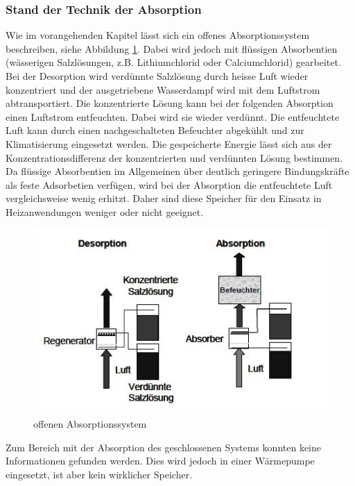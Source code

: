\documentclass[11pt,a4paper]{scrartcl}
\begin{document}
\subsubsection{Stand der Technik der Absorption}

Wie im vorangehenden Kapitel lässt sich ein offenes Absorptionssystem
beschreiben, siehe Abbildung \ref{fig:offenessystemabsorption}. Dabei wird
jedoch mit flüssigen Absorbentien (wässerigen Salzlösungen, z.B. Lithiumchlorid
oder Calciumchlorid) gearbeitet.
Bei der Desorption wird verdünnte Salzlösung durch heisse Luft wieder
konzentriert und der ausgetriebene Wasserdampf wird mit dem Luftstrom
abtransportiert. Die konzentrierte Lösung kann bei der folgenden Absorption
einen Luftstrom entfeuchten. Dabei wird sie wieder verdünnt. Die entfeuchtete
Luft kann durch einen nachgeschalteten Befeuchter abgekühlt und zur
Klimatisierung eingesetzt werden. Die gespeicherte Energie lässt sich aus der
Konzentrationsdifferenz der konzentrierten und verdünnten Lösung bestimmen. Da
flüssige Absorbentien im Allgemeinen über deutlich geringere Bindungskräfte als
feste Adsorbetien verfügen, wird bei der Absorption die entfeuchtete Luft
vergleichsweise wenig erhitzt. Daher sind diese Speicher für den Einsatz in
Heizanwendungen weniger oder nicht geeignet.

\begin{figure}[h!]
\begin{center}
\includegraphics[scale=1]{images/offenessystemabsorption.jpg}
\caption{offenen Absorptionssystem}
\label{fig:offenessystemabsorption}
\end{center}
\end{figure}


Zum Bereich mit der Absorption des geschlossenen Systems konnten keine
Informationen gefunden werden. Dies wird jedoch in einer Wärmepumpe eingesetzt,
ist aber kein wirklicher Speicher.
\end{document}
